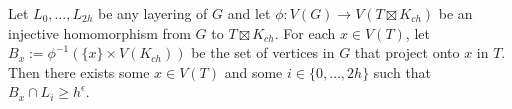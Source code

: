 \documentclass{patmorin}
\begin{document}


\begin{lem}
  Let $L_0,\ldots,L_{2h}$ be any layering of $G$ and let $\phi:V(G)\to V(T\boxtimes K_{ch})$ be an injective homomorphism from $G$ to $T\boxtimes K_{ch}$. For each $x\in V(T)$, let $B_x := \phi^{-1}(\{x\}\times V(K_{ch}))$ be the set of vertices in $G$ that project onto $x$ in $T$.  Then there exists some $x\in V(T)$ and some $i\in\{0,\ldots,2h\}$ such that $B_x\cap L_i\ge h^{\epsilon}$.
\end{lem}
\end{document}

